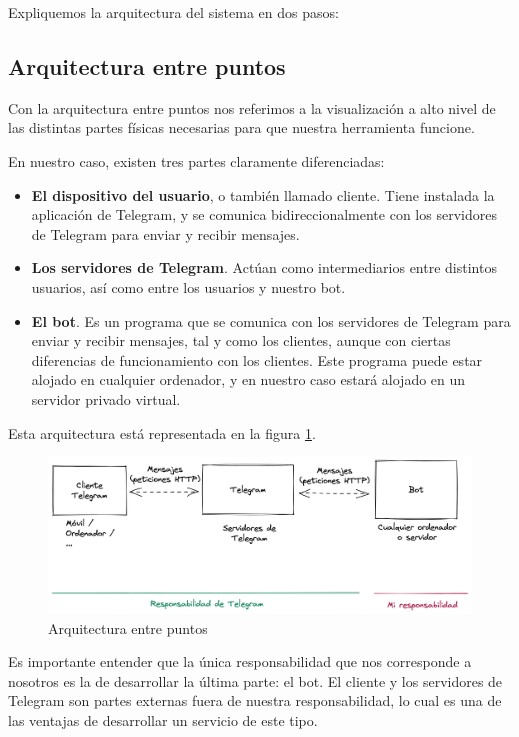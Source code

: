 Expliquemos la arquitectura del sistema en dos pasos:

\subsection{Arquitectura entre puntos}

Con la arquitectura entre puntos nos referimos a la visualización a alto nivel de las distintas partes físicas necesarias para que nuestra herramienta funcione.

En nuestro caso, existen tres partes claramente diferenciadas:

\begin{itemize}
    \item \textbf{El dispositivo del usuario}, o también llamado cliente. Tiene instalada la aplicación de Telegram, y se comunica bidireccionalmente con los servidores de Telegram para enviar y recibir mensajes.
    \item \textbf{Los servidores de Telegram}. Actúan como intermediarios entre distintos usuarios, así como entre los usuarios y nuestro bot.
    \item \textbf{El bot}. Es un programa que se comunica con los servidores de Telegram para enviar y recibir mensajes, tal y como los clientes, aunque con ciertas diferencias de funcionamiento con los clientes. Este programa puede estar alojado en cualquier ordenador, y en nuestro caso estará alojado en un servidor privado virtual.
\end{itemize}

Esta arquitectura está representada en la figura \ref{fig:arquitecturaPuntos}.

\begin{figure}[h]
\centering
\includegraphics[width=1\textwidth]{imagenes/disenyo_tecnico/arquitectura_puntos.png}
\caption{Arquitectura entre puntos}
\label{fig:arquitecturaPuntos}
\end{figure}

Es importante entender que la única responsabilidad que nos corresponde a nosotros es la de desarrollar la última parte: el bot. El cliente y los servidores de Telegram son partes externas fuera de nuestra responsabilidad, lo cual es una de las ventajas de desarrollar un servicio de este tipo.


